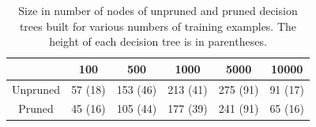 \begin{table}
    \centering
    \begin{tabular}{|c|c|c|c|c|c|}
        \hline
        & 100 & 500 & 1000 & 5000 & 10000 \\
        \hline
        Unpruned & 57 (18) & 153 (46) & 213 (41) & 275 (91) & 91 (17) \\
        \hline
        Pruned  & 45 (16) & 105 (44)  & 177 (39) & 241 (91) & 65 (16) \\
        \hline
    \end{tabular}
    \caption{Size in number of nodes of unpruned and pruned decision trees built for various numbers of training examples. The height of each decision tree is in parentheses.}
    \label{table:dt_sizes}
\end{table}
